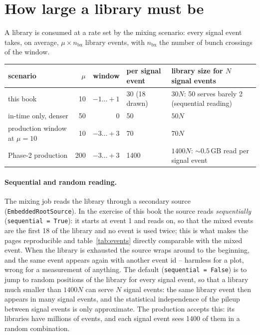 \documentclass[11pt,a4paper]{article}
\newcommand{\code}[1]{\texttt{#1}}
\newcommand{\bx}{\ensuremath{\mathrm{bx}}}
\begin{document}
\FloatBarrier
\section{How large a library must be}
\label{sec:size}

A library is consumed at a rate set by the mixing scenario: every signal event takes, on average,
$\mu\times n_{\bx}$ library events, with $n_{\bx}$ the number of bunch crossings of the window.
\begin{center}\small
\begin{tabularx}{\textwidth}{lrrlX}
\toprule
scenario & $\mu$ & window & per signal event & library size for $N$ signal events \\
\midrule
this book & 10 & $-1\ldots+1$ & 30 (18 drawn) & $30N$: 50 serves barely 2 (sequential reading) \\
in-time only, denser & 50 & $0$ & 50 & $50N$ \\
production window at $\mu=10$ & 10 & $-3\ldots+3$ & 70 & $70N$ \\
Phase-2 production & 200 & $-3\ldots+3$ & 1400 & $1400N$: $\sim0.5$\,GB read per signal event \\
\bottomrule
\end{tabularx}
\end{center}

\paragraph{Sequential and random reading.} The mixing job reads the library through a secondary source
(\code{EmbeddedRootSource}). In the exercise of this book the source reads \emph{sequentially}
(\code{sequential = True}): it starts at event 1 and reads on, so that the mixed events are the first 18 of
the library and no event is used twice; this is what makes the pages reproducible and
table~\ref{tab:events} directly comparable with the mixed event. When the library is exhausted the source
wraps around to the beginning, and the same event appears again with another event id -- harmless for a
plot, wrong for a measurement of anything. The default (\code{sequential = False}) is to jump to random
positions of the library for every signal event, so that a library much smaller than $1400N$ can serve $N$
signal events: the same library event then appears in many signal events, and the statistical
independence of the pileup between signal events is only approximate. The production accepts this: its
libraries have millions of events, and each signal event sees 1400 of them in a random combination.
\end{document}
